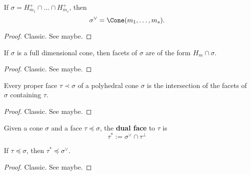 \begin{proposition}
  \label{1-2-8-dual-cone-inter-halfspaces}

  If $\sigma = H_{m_1}^+ \cap \dots \cap H_{m_s}^+$, then
  $$\sigma^\vee = \Cone(m_1, \dots, m_s).$$
\end{proposition}
\begin{proof}
  \uses{}

  Classic. See \cite{Oda_1988} maybe.
\end{proof}


\begin{proposition}
  \label{1-2-8-facet-full-dim-cone}

  If $\sigma$ is a full dimensional cone, then facets of $\sigma$ are of the form $H_m \cap \sigma$.
\end{proposition}
\begin{proof}
  \uses{}

  Classic. See \cite{Oda_1988} maybe.
\end{proof}


\begin{proposition}
  \label{1-2-8-inter-facet}

  Every proper face $\tau \prec \sigma$ of a polyhedral cone $\sigma$ is the intersection of the facets of $\sigma$ containing $\tau$.
\end{proposition}
\begin{proof}
  \uses{}

  Classic. See \cite{Oda_1988} maybe.
\end{proof}


\begin{definition}
  \label{1-2-10-dual-face}

  Given a cone $\sigma$ and a face $\tau \preceq \sigma$, the {\bf dual face} to $\tau$ is
  $$\tau^* := \sigma^\vee \cap \tau^\perp$$
\end{definition}


\begin{proposition}
  \label{1-2-10-dual-face-face-dual}

  If $\tau \preceq \sigma$, then $\tau^* \preceq \sigma^\vee$.
\end{proposition}
\begin{proof}
  \uses{}

  Classic. See \cite{Oda_1988} maybe.
\end{proof}



